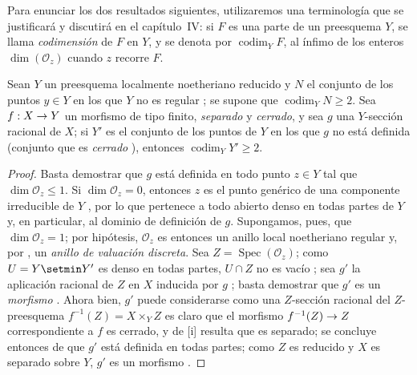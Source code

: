 \documentclass[oneside,10pt]{amsart}
\makeatletter
\renewcommand{\leq}{\leqslant}
\renewcommand{\geq}{\geqslant}
\newcommand{\ega@arrow}[2]{\mathchoice{#1}{#2}{#2}{#2}}
\renewcommand{\to}{\ega@arrow{\longrightarrow}{\rightarrow}}
\newcommand{\oldpage}[2][]{\marginnote{\normalfont\footnotesize\textbf{#1}~|~#2}\ignorespaces}
\let\EGAOriginalLabel\label
\renewcommand{\label}[1]{\phantomsection\EGAOriginalLabel{#1}}
\makeatother
\begin{document}
\begin{env}[7.3.4]
\label{II.7.3.4-fr}
Para enunciar los dos resultados siguientes, utilizaremos una terminología que se justificará y discutirá en el capítulo~IV:
si $F$ es una parte
\oldpage[II]{144}
de un preesquema $Y$, se llama \emph{codimensión} de $F$ en $Y$, y se denota por $\operatorname{codim}_YF$, al ínfimo de los enteros $\dim(\mathcal{O}_z)$ cuando $z$ recorre $F$.
\end{env}

\begin{corollary}[7.3.5]
\label{II.7.3.5-fr}
Sean $Y$ un preesquema localmente noetheriano reducido y $N$ el conjunto de los puntos $y\in Y$ en los que $Y$ no es regular ;
se supone que $\operatorname{codim}_YN\geq2$.
Sea $f:X\to Y$ un morfismo de tipo finito, \emph{separado} y \emph{cerrado}, y sea $g$ una $Y$-sección racional de $X$;
si $Y'$ es el conjunto de los puntos de $Y$ en los que $g$ no está definida \textup{(conjunto que es \emph{cerrado} )}, entonces $\operatorname{codim}_YY'\geq2$.
\end{corollary}

\begin{proof}
Basta demostrar que $g$ está definida en todo punto $z\in Y$ tal que $\dim\mathcal{O}_z\leq1$.
Si $\dim\mathcal{O}_z=0$, entonces $z$ es el punto genérico de una componente irreducible de $Y$ , por lo que pertenece a todo abierto denso en todas partes de $Y$ y, en particular, al dominio de definición de $g$.
Supongamos, pues, que $\dim\mathcal{O}_z=1$;
por hipótesis, $\mathcal{O}_z$ es entonces un anillo local noetheriano regular y, por , un \emph{anillo de valuación discreta}.
Sea $Z=\operatorname{Spec}(\mathcal{O}_z)$;
como $U=Y\setmin Y'$ es denso en todas partes, $U\cap Z$ no es vacío ;
sea $g'$ la aplicación racional de $Z$ en $X$ inducida por $g$ ;
basta demostrar que $g'$ es un \emph{morfismo} .
Ahora bien, $g'$ puede considerarse como una $Z$-sección racional del $Z$-preesquema
$f^{-1}(Z)=X\times_YZ$
es claro que el morfismo $f^{-1}(Z)\to Z$ correspondiente a $f$ es cerrado, y de [i] resulta que es separado;
se concluye entonces de  que $g'$ está definida en todas partes;
como $Z$ es reducido y $X$ es separado sobre $Y$, $g'$ es un morfismo .
\end{proof}

\end{document}
